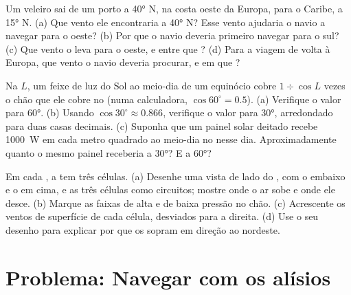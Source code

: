 \begin{exercise}[$\star\star$]\label{exo:g8:winds-global-circulation:10}
Um veleiro sai de um porto a \ang{40} N, na costa oeste da Europa, para o
Caribe, a \ang{15} N. (a) Que vento ele encontraria a \ang{40} N? Esse
vento ajudaria o navio a navegar para o oeste? (b) Por que o navio deveria
primeiro navegar para o sul? (c) Que vento o leva para o oeste, e entre
que ? (d) Para a viagem de volta à Europa, que vento o navio
deveria procurar, e em que ?
\end{exercise}

\begin{exercise}[$\star\star\star$]\label{exo:g8:winds-global-circulation:11}
Na  $L$, um feixe de luz do Sol ao meio-dia de um equinócio cobre $1 \div
\cos L$ vezes o chão que ele cobre no  (numa calculadora,
$\cos 60^\circ = 0.5$). (a) Verifique o valor para \ang{60}. (b) Usando
$\cos 30^\circ \approx 0.866$, verifique o valor para \ang{30}, arredondado
para duas casas decimais. (c) Suponha que um painel solar deitado recebe
\qty{1000}{W} em cada metro quadrado ao meio-dia no  nesse dia.
Aproximadamente quanto o mesmo painel receberia a \ang{30}? E a \ang{60}?
\end{exercise}

\begin{exercise}[$\star\star\star$]\label{exo:g8:winds-global-circulation:12}
Em cada , a  tem três células. (a) Desenhe uma
vista de lado do , com o  embaixo e o  em cima,
e as três células como circuitos; mostre onde o ar sobe e onde ele desce.
(b) Marque as faixas de alta e de baixa pressão no chão. (c) Acrescente
os ventos de superfície de cada célula, desviados para a direita.
(d) Use o seu desenho para explicar por que os  sopram em
direção ao nordeste.
\end{exercise}

\section{Problema: Navegar com os alísios}


